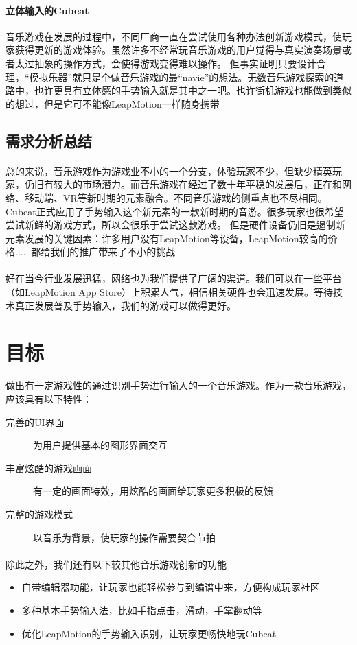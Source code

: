 \documentclass{article}
\begin{document}
\paragraph{立体输入的Cubeat}
音乐游戏在发展的过程中，不同厂商一直在尝试使用各种办法创新游戏模式，使玩家获得更新的游戏体验。虽然许多不经常玩音乐游戏的用户觉得与真实演奏场景或者太过抽象的操作方式，会使得游戏变得难以操作。
但事实证明只要设计合理，“模拟乐器”就只是个做音乐游戏的最“navie”的想法。无数音乐游戏探索的道路中，也许更具有立体感的手势输入就是其中之一吧。也许街机游戏也能做到类似的想过，但是它可不能像LeapMotion一样随身携带
\subsection{需求分析总结}
\paragraph{}
总的来说，音乐游戏作为游戏业不小的一个分支，体验玩家不少，但缺少精英玩家，仍旧有较大的市场潜力。而音乐游戏在经过了数十年平稳的发展后，正在和网络、移动端、VR等新时期的元素融合。不同音乐游戏的侧重点也不尽相同。
Cubeat正式应用了手势输入这个新元素的一款新时期的音游。很多玩家也很希望尝试新鲜的游戏方式，所以会很乐于尝试这款游戏。
但是硬件设备仍旧是遏制新元素发展的关键因素：许多用户没有LeapMotion等设备，LeapMotion较高的价格......都给我们的推广带来了不小的挑战
\paragraph{}
好在当今行业发展迅猛，网络也为我们提供了广阔的渠道。我们可以在一些平台（如LeapMotion App Store）上积累人气，相信相关硬件也会迅速发展。等待技术真正发展普及手势输入，我们的游戏可以做得更好。
\newpage
\section{目标}
做出有一定游戏性的通过识别手势进行输入的一个音乐游戏。作为一款音乐游戏，应该具有以下特性：
\begin{description}
  \item[完善的UI界面] 为用户提供基本的图形界面交互
  \item[丰富炫酷的游戏画面] 有一定的画面特效，用炫酷的画面给玩家更多积极的反馈
  \item[完整的游戏模式] 以音乐为背景，使玩家的操作需要契合节拍
\end{description}
\paragraph{}
除此之外，我们还有以下较其他音乐游戏创新的功能
\begin{itemize}
  \item 自带编辑器功能，让玩家也能轻松参与到编谱中来，方便构成玩家社区
  \item 多种基本手势输入法，比如手指点击，滑动，手掌翻动等
  \item 优化LeapMotion的手势输入识别，让玩家更畅快地玩Cubeat
\end{itemize}
\end{document}
